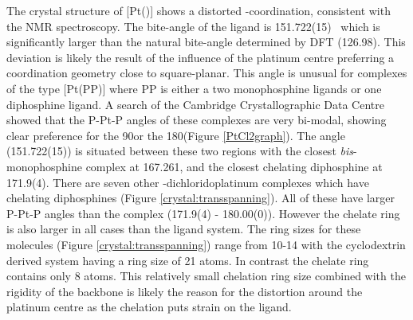 The crystal structure of [Pt(\tButhixantphos)] shows a distorted \trans-coordination, consistent with the NMR spectroscopy.  The bite-angle of the ligand is 151.722(15)~\degrees{} which is significantly larger than the natural bite-angle determined by DFT (126.98\degrees{}).  This deviation is likely the result of the influence of the platinum centre preferring a coordination geometry close to square-planar.  This angle is unusual for complexes of the type [Pt(PP)] where PP is either a two monophosphine ligands or one diphosphine ligand.  A search of the Cambridge Crystallographic Data Centre  showed that the P-Pt-P angles of these complexes are very bi-modal, showing clear preference for the \cis{} 90\degrees or the \trans{} 180\degrees (Figure \ref{PtCl2graph}).  The \tButhixantphos{} angle (151.722(15)\degrees) is situated between these two regions with the closest \emph{bis}-monophosphine complex at 167.261, and the closest chelating diphosphine at 171.9(4)\degrees{}.  There are seven other \trans{}-dichloridoplatinum complexes which have chelating diphosphines (Figure \ref{crystal:transspanning}).\cite{Bachechi1992, Engeldinger2003, Newman2012, Owens2008, Beuken1997, Freixa2003b, Ruhland2007}  All of these have larger P-Pt-P angles than the \tButhixantphos{} complex (171.9(4) - 180.00(0)\degrees {}).  However the chelate ring is also larger in all cases than the \tButhixantphos{} ligand system.  The ring sizes for these molecules (Figure \ref{crystal:transspanning}) range from 10-14 with the cyclodextrin derived system having a ring size of 21 atoms.  In contrast the \tButhixantphos{} chelate ring contains only 8 atoms.  This relatively small chelation ring size combined with the rigidity of the backbone is likely the reason for the distortion around the platinum centre as the \trans{} chelation puts strain on the \tButhixantphos{} ligand.  

